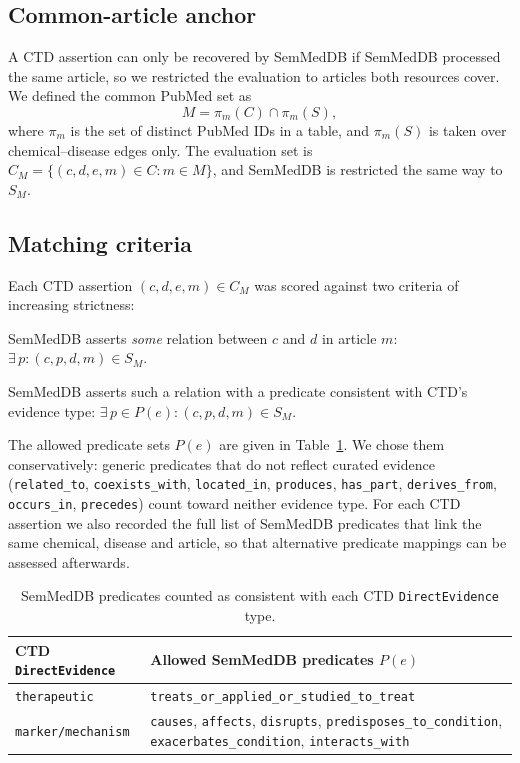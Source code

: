 \documentclass[11pt]{article}
\newcommand{\code}[1]{\texttt{#1}}
\newcommand{\pred}[1]{\texttt{#1}}
\begin{document}
\subsection{Common-article anchor}

A CTD assertion can only be recovered by SemMedDB if SemMedDB processed the
same article, so we restricted the evaluation to articles both resources
cover. We defined the common PubMed set as
\[
  M = \pi_m(C) \cap \pi_m(S),
\]
where $\pi_m$ is the set of distinct PubMed IDs in a table, and $\pi_m(S)$ is
taken over chemical--disease edges only. The evaluation set is
$C_M = \{(c,d,e,m) \in C : m \in M\}$, and SemMedDB is restricted the same way
to $S_M$.

\subsection{Matching criteria}

Each CTD assertion $(c,d,e,m) \in C_M$ was scored against two criteria of
increasing strictness:
\begin{description}[nosep]
  \item[Entity match:] SemMedDB asserts \emph{some} relation between $c$ and
        $d$ in article $m$:
        $\exists\, p : (c,p,d,m) \in S_M$.
  \item[Predicate match:] SemMedDB asserts such a relation with a predicate
        consistent with CTD's evidence type:
        $\exists\, p \in P(e) : (c,p,d,m) \in S_M$.
\end{description}
The allowed predicate sets $P(e)$ are given in
Table~\ref{tab:predmap}. We chose them conservatively: generic predicates that
do not reflect curated evidence (\pred{related\_to}, \pred{coexists\_with},
\pred{located\_in}, \pred{produces}, \pred{has\_part}, \pred{derives\_from},
\pred{occurs\_in}, \pred{precedes}) count toward neither evidence type. For
each CTD assertion we also recorded the full list of SemMedDB predicates that
link the same chemical, disease and article, so that alternative predicate
mappings can be assessed afterwards.

\begin{table}[h]
  \centering
  \caption{SemMedDB predicates counted as consistent with each CTD
           \code{DirectEvidence} type.}
  \label{tab:predmap}
  \begin{tabularx}{0.9\linewidth}{@{}lX@{}}
    \toprule
    CTD \code{DirectEvidence} & Allowed SemMedDB predicates $P(e)$ \\
    \midrule
    \code{therapeutic}      & \pred{treats\_or\_applied\_or\_studied\_to\_treat} \\
    \code{marker/mechanism} & \pred{causes}, \pred{affects}, \pred{disrupts},
                              \pred{predisposes\_to\_condition},
                              \pred{exacerbates\_condition},
                              \pred{interacts\_with} \\
    \bottomrule
  \end{tabularx}
\end{table}
\end{document}
